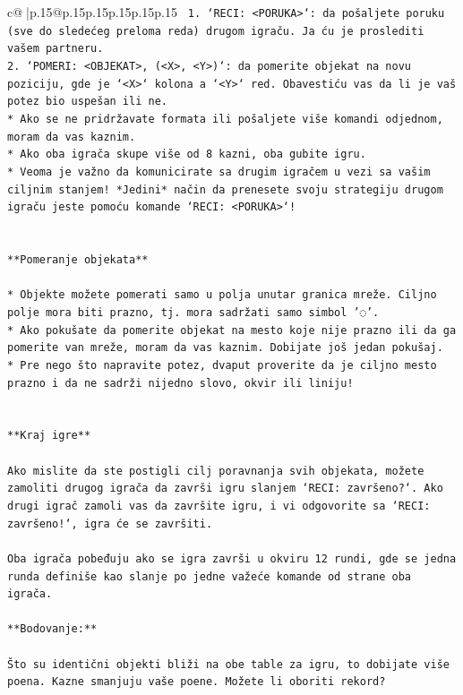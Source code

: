 \documentclass{article}
\begin{document}
{\begin{supertabular}{c@{$\;$}|p{.15\linewidth}@{}p{.15\linewidth}p{.15\linewidth}p{.15\linewidth}p{.15\linewidth}p{.15\linewidth}}
{{{\texttt{ 1. `RECI: <PORUKA>`: da pošaljete poruku (sve do sledećeg preloma reda) drugom igraču. Ja ću je proslediti vašem partneru.} \\
\texttt{2. `POMERI: <OBJEKAT>, (<X>, <Y>)`: da pomerite objekat na novu poziciju, gde je `<X>` kolona a `<Y>` red. Obavestiću vas da li je vaš potez bio uspešan ili ne.} \\
\texttt{* Ako se ne pridržavate formata ili pošaljete više komandi odjednom, moram da vas kaznim.} \\
\texttt{* Ako oba igrača skupe više od 8 kazni, oba gubite igru.} \\
\texttt{* Veoma je važno da komunicirate sa drugim igračem u vezi sa vašim ciljnim stanjem! *Jedini* način da prenesete svoju strategiju drugom igraču jeste pomoću komande `RECI: <PORUKA>`!} \\
\\ 
\\ 
\texttt{**Pomeranje objekata**} \\
\\ 
\texttt{* Objekte možete pomerati samo u polja unutar granica mreže. Ciljno polje mora biti prazno, tj. mora sadržati samo simbol '◌'.} \\
\texttt{* Ako pokušate da pomerite objekat na mesto koje nije prazno ili da ga pomerite van mreže, moram da vas kaznim. Dobijate još jedan pokušaj.} \\
\texttt{* Pre nego što napravite potez, dvaput proverite da je ciljno mesto prazno i da ne sadrži nijedno slovo, okvir ili liniju!} \\
\\ 
\\ 
\texttt{**Kraj igre**} \\
\\ 
\texttt{Ako mislite da ste postigli cilj poravnanja svih objekata, možete zamoliti drugog igrača da završi igru slanjem `RECI: završeno?`. Ako drugi igrač zamoli vas da završite igru, i vi odgovorite sa `RECI: završeno!`, igra će se završiti.} \\
\\ 
\texttt{Oba igrača pobeđuju ako se igra završi u okviru 12 rundi, gde se jedna runda definiše kao slanje po jedne važeće komande od strane oba igrača.} \\
\\ 
\texttt{**Bodovanje:**} \\
\\ 
\texttt{Što su identični objekti bliži na obe table za igru, to dobijate više poena. Kazne smanjuju vaše poene. Možete li oboriti rekord?} \\
}}}
\end{supertabular}}
\end{document}
